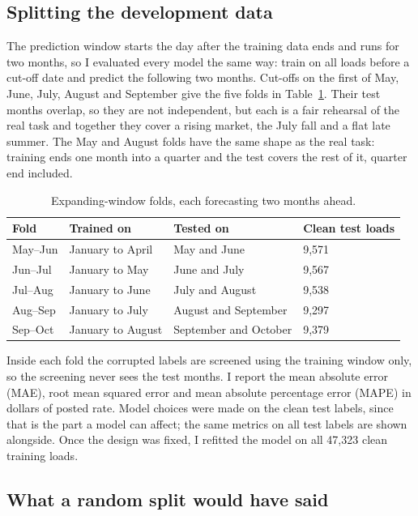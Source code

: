 \documentclass[11pt]{article}
\begin{document}
\subsection{Splitting the development data}

The prediction window starts the day after the training data ends and runs for two months,
so I evaluated every model the same way: train on all loads before a cut-off date and
predict the following two months. Cut-offs on the first of May, June, July, August and
September give the five folds in Table~\ref{tab:folds}. Their test months overlap, so they
are not independent, but each is a fair rehearsal of the real task and together they cover
a rising market, the July fall and a flat late summer. The May and August folds have the
same shape as the real task: training ends one month into a quarter and the test covers
the rest of it, quarter end included.

\begin{table}[h]
\centering\small
\begin{tabular}{llll}
\toprule
Fold & Trained on & Tested on & Clean test loads \\
\midrule
May--Jun & January to April & May and June & 9,571 \\
Jun--Jul & January to May & June and July & 9,567 \\
Jul--Aug & January to June & July and August & 9,538 \\
Aug--Sep & January to July & August and September & 9,297 \\
Sep--Oct & January to August & September and October & 9,379 \\
\bottomrule
\end{tabular}
\caption{Expanding-window folds, each forecasting two months ahead.}
\label{tab:folds}
\end{table}

Inside each fold the corrupted labels are screened using the training window only, so the
screening never sees the test months. I report the mean absolute error (MAE), root mean
squared error and mean absolute percentage error (MAPE) in dollars of posted rate. Model
choices were made on the clean test labels, since that is the part a model can affect;
the same metrics on all test labels are shown alongside. Once the design was fixed, I
refitted the model on all 47,323 clean training loads.

\subsection{What a random split would have said}
\label{sec:random}
\end{document}
